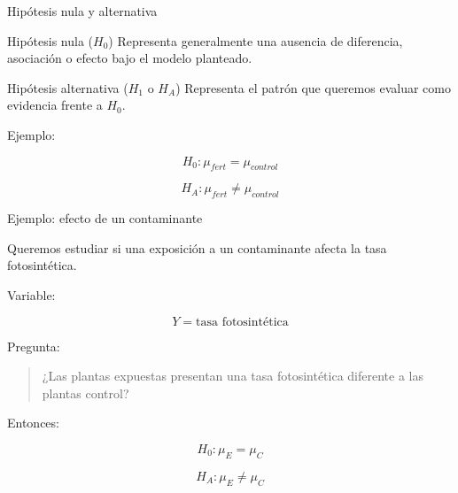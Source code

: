 \documentclass[11pt, aspectratio=169]{beamer}
\begin{document}
\begin{frame}{Hipótesis nula y alternativa}

\begin{block}{Hipótesis nula ($H_0$)}
Representa generalmente una ausencia de diferencia, asociación o efecto
bajo el modelo planteado.
\end{block}

\begin{block}{Hipótesis alternativa ($H_1$ o $H_A$)}
Representa el patrón que queremos evaluar como evidencia frente a $H_0$.
\end{block}

\vspace{0.3cm}

Ejemplo:

\[
H_0:\mu_{fert}=\mu_{control}
\]

\[
H_A:\mu_{fert}\neq\mu_{control}
\]

\end{frame}

%
%
%
%
%
%
%
%
%
%

\begin{frame}{Ejemplo: efecto de un contaminante}

Queremos estudiar si una exposición a un contaminante afecta
la tasa fotosintética.

Variable:

\[
Y = \text{tasa fotosintética}
\]

Pregunta:

\begin{quote}
¿Las plantas expuestas presentan una tasa fotosintética diferente
a las plantas control?
\end{quote}

Entonces:

\[
H_0:\mu_E=\mu_C
\]

\[
H_A:\mu_E\neq\mu_C
\]

\end{frame}
\end{document}
